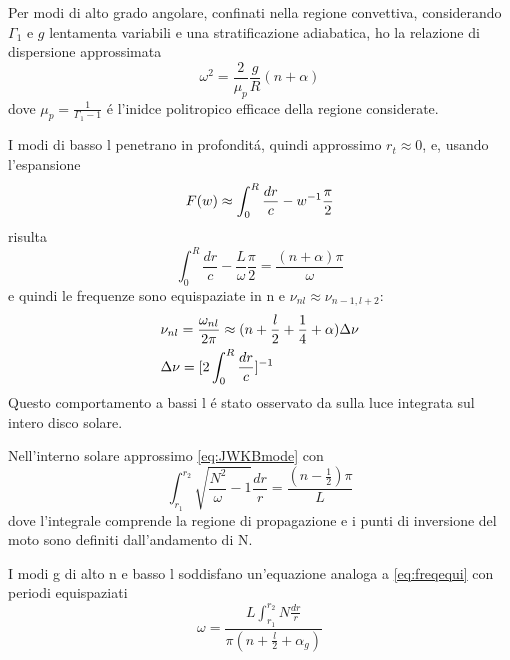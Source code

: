\documentclass[../main.tex]{subfiles}
\begin{document}
Per modi di alto grado angolare, confinati nella regione convettiva, considerando $\Gamma_1$ e $g$ lentamenta variabili e una stratificazione adiabatica, ho la relazione di dispersione approssimata
\begin{equation}
\omega^2=\frac{2}{\mu_p}\frac{g}{R}(n+\alpha)
\end{equation}
dove $\mu_p=\frac{1}{\Gamma_1-1}$ \'e l'inidce politropico efficace della regione considerate. 

I modi di basso l penetrano in profondit\'a, quindi approssimo $r_t\approx0$, e, usando l'espansione
\begin{equation}
F(w)\approx\int_0^R\frac{dr}{c}-w^{-1}\frac{\pi}{2}
\end{equation}
 risulta
\begin{equation}
\int_0^R\frac{dr}{c}-\frac{L}{\omega}\frac{\pi}{2}=\frac{(n+\alpha)\pi}{\omega}
\end{equation}
e quindi le  frequenze sono equispaziate in n e $\nu_{nl}\approx\nu_{n-1,l+2}$:
\begin{align}
&\nu_{nl}=\frac{\omega_{nl}}{2\pi}\approx(n+\frac{l}{2}+\frac{1}{4}+\alpha)\Delta\nu\label{eq:freqequi}\\
&\Delta\nu=[2\int_0^R\frac{dr}{c}]^{-1}
\end{align}
Questo comportamento a bassi l \'e stato osservato da \cite{cla79solar} sulla luce integrata sul intero disco solare.


Nell'interno solare approssimo \eqref{eq:JWKBmode} con
\begin{equation}
\int_{r_1}^{r_2}\sqrt{\frac{N^2}{\omega}-1}\frac{dr}{r}=\frac{(n-\frac{1}{2})\pi}{L}
\end{equation}
dove l'integrale comprende la regione di propagazione e i punti di inversione del moto sono definiti dall'andamento di N.

I modi g di alto n e basso l soddisfano un'equazione analoga a \eqref{eq:freqequi} con periodi equispaziati
\begin{equation}
\omega=\frac{L\int_{r_1}^{r_2}N\frac{dr}{r}}{\pi(n+\frac{l}{2}+\alpha_g)}
\end{equation}


\end{document}
